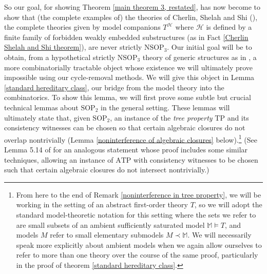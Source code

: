 \documentclass{amsart}
\theoremstyle{definition}
\theoremstyle{remark}
\numberwithin{equation}{section}
\begin{document}
So our goal, for showing Theorem \ref{main theorem 3, restated}, has now become to show that (the complete examples of) the theories of Cherlin, Shelah and Shi (\cite{CSS99}), the complete theories given by model companions $T^{\mathcal{H}}$ where $\mathcal{H}$ is defined by a finite family of forbidden weakly embedded substructures (as in Fact \ref{Cherlin Shelah and Shi theorem}), are never strictly $\mathrm{NSOP}_{3}$. Our initial goal will be to obtain, from a hypothetical strictly $\mathrm{NSOP}_{3}$ theory of generic structures as in \cite{CSS99}, a more combinatorially tractable object whose existence we will ultimately prove impossible using our cycle-removal methods. We will give this object in Lemma \ref{standard hereditary class}, our bridge from the model theory into the combinatorics.  To show this lemma, we will first prove some subtle but crucial technical lemmas about $\mathrm{SOP}_{2}$ in the general setting. These lemmas will ultimately state that, given $\mathrm{SOP}_{2}$, an instance of the \textit{tree property} $\mathrm{TP}$ and its consistency witnesses can be chosen so that certain algebraic closures do not overlap nontrivially (Lemma \ref{noninterference of algebraic closures} below).\footnote{From here to the end of Remark \ref{noninterference in tree property}, we will be working in the setting of an abstract first-order theory $T$, so we will adopt the standard model-theoretic notation for this setting where the sets we refer to are small subsets of an ambient sufficiently saturated model $\mathbb{M} \models T$, and models $M$ refer to small elementary submodels $M \prec \mathbb{M}$. We will necessarily speak more explicitly about ambient models when we again allow ourselves to refer to more than one theory over the course of the same proof, particularly in the proof of theorem \ref{standard hereditary class}.} (See Lemma 5.14 of \cite{AKLL25} for an analogous statement whose proof includes some similar techniques, allowing an instance of $\mathrm{ATP}$ with consistency witnesses to be chosen such that certain algebraic closures do not intersect nontrivially.)
\end{document}
